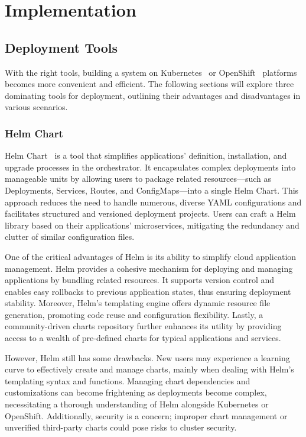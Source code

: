 
\chapter{Implementation}\label{chapter:implementation}

\section{Deployment Tools}

With the right tools, building a system on Kubernetes~\parencite{ProductionGradeContainerOrchestration} or OpenShift~\parencite{RedHatOpenShift} platforms becomes more convenient and efficient. The following sections will explore three dominating tools for deployment, outlining their advantages and disadvantages in various scenarios. 

\subsection{Helm Chart}

Helm Chart~\parencite{Helm} is a tool that simplifies applications' definition, installation, and upgrade processes in the orchestrator. It encapsulates complex deployments into manageable units by allowing users to package related resources—such as Deployments, Services, Routes, and ConfigMaps—into a single Helm Chart. This approach reduces the need to handle numerous, diverse YAML configurations and facilitates structured and versioned deployment projects. Users can craft a Helm library based on their applications' microservices, mitigating the redundancy and clutter of similar configuration files. 

One of the critical advantages of Helm is its ability to simplify cloud application management. Helm provides a cohesive mechanism for deploying and managing applications by bundling related resources. It supports version control and enables easy rollbacks to previous application states, thus ensuring deployment stability. Moreover, Helm's templating engine offers dynamic resource file generation, promoting code reuse and configuration flexibility. Lastly, a community-driven charts repository further enhances its utility by providing access to a wealth of pre-defined charts for typical applications and services.

However, Helm still has some drawbacks. New users may experience a learning curve to effectively create and manage charts, mainly when dealing with Helm's templating syntax and functions. Managing chart dependencies and customizations can become frightening as deployments become complex, necessitating a thorough understanding of Helm alongside Kubernetes or OpenShift. Additionally, security is a concern; improper chart management or unverified third-party charts could pose risks to cluster security. 


